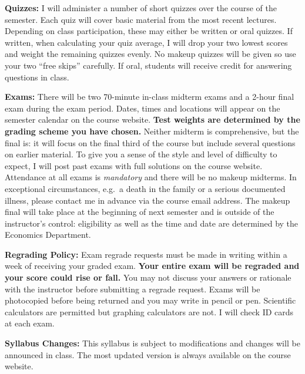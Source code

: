 \documentclass[11pt, letterpaper]{article}
\begin{document}
\medskip

\noindent \textbf{Quizzes:} 
I will administer a number of short quizzes over the course of the semester.
Each quiz will cover basic material from the most recent lectures.
Depending on class participation, these may either be written or oral quizzes.
If written, when calculating your quiz average, I will drop your two lowest scores and weight the remaining quizzes evenly. 
No makeup quizzes will be given so use your two ``free skips'' carefully.
If oral, students will receive credit for answering questions in class.

\medskip

\noindent \textbf{Exams:} 
There will be two 70-minute in-class midterm exams and a 2-hour final exam during the exam period.
Dates, times and locations will appear on the semester calendar on the course website.
\textbf{Test weights are determined by the grading scheme you have chosen.}
Neither midterm is comprehensive, but the final is: it will focus on the final third of the course but include several questions on earlier material.
To give you a sense of the style and level of difficulty to expect, I will post past exams with full solutions on the course website.
Attendance at all exams is \emph{mandatory} and there will be no makeup midterms.
In exceptional circumstances, e.g.\ a death in the family or a serious documented illness, please contact me in advance via the course email address.
The makeup final will take place at the beginning of next semester and is outside of the instructor's control: eligibility as well as the time and date are determined by the Economics Department. 

\medskip

\noindent \textbf{Regrading Policy:} Exam regrade requests must be made in writing within a week of receiving your graded exam. 
\textbf{Your entire exam will be regraded and your score could rise or fall.}
You may not discuss your answers or rationale with the instructor before submitting a regrade request. 
Exams will be photocopied before being returned and you may write in pencil or pen. 
Scientific calculators are permitted but graphing calculators are not. 
I will check ID cards at each exam.

\medskip

\noindent \textbf{Syllabus Changes:} This syllabus is subject to modifications and changes will be announced in class. The most updated version is always available on the course website.

\newpage
\end{document}
